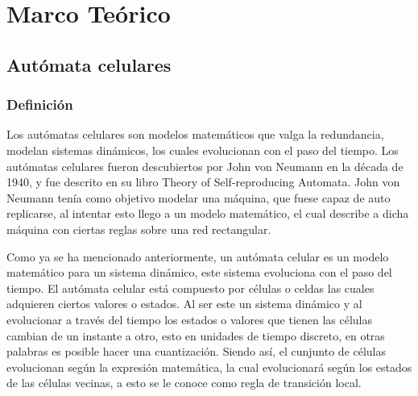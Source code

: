 \documentclass[12pt, fleqn]{report}                             %
\theoremstyle{break}                                            %
\begin{document}
\restoregeometry                                                    %
\nopagecolor                                                        %




\tableofcontents{}
\label{sec:Index}

\clearpage


\part{Marco Teórico}
\clearpage

  \chapter{Autómata celulares}

        \clearpage
        \section{Definición}

        Los autómatas celulares son modelos matemáticos que valga la redundancia, modelan
        sistemas dinámicos, los cuales evolucionan con el paso del tiempo. Los autómatas
        celulares fueron descubiertos por John von Neumann en la década de 1940, y fue
        descrito en su libro Theory of Self-reproducing Automata. John von Neumann tenía
        como objetivo modelar una máquina, que fuese capaz de auto replicarse, al intentar
        esto llego a un modelo matemático, el cual describe a dicha máquina con ciertas
        reglas sobre una red rectangular.

        Como ya se ha mencionado anteriormente, un autómata celular es un modelo matemático
        para un sistema dinámico, este sistema evoluciona con el paso del tiempo. El autómata celular está compuesto por células o celdas las cuales adquieren ciertos valores
        o estados. Al ser este un sistema dinámico y al evolucionar a través del tiempo
        los estados o valores que tienen las células cambian de un instante a otro, esto en
        unidades de tiempo discreto, en otras palabras es posible hacer una cuantización.
        Siendo así, el cunjunto de células evolucionan según la expresión matemática, la cual
        evolucionará según los estados de las células vecinas, a esto se le conoce como regla
        de transición local.
        
\end{document}

